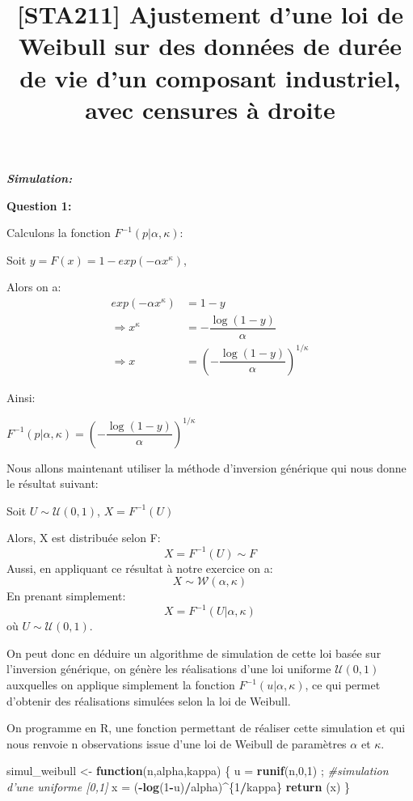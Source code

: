 \documentclass[
]{article}
\title{{[}STA211{]} Ajustement d'une loi de Weibull sur des données de durée de
vie d'un composant industriel, avec censures à droite}
\author{}
\date{\vspace{-2.5em}}
\newenvironment{Shaded}{\begin{snugshade}}{\end{snugshade}}
\newcommand{\CommentTok}[1]{\textcolor[rgb]{0.56,0.35,0.01}{\textit{#1}}}
\newcommand{\ControlFlowTok}[1]{\textcolor[rgb]{0.13,0.29,0.53}{\textbf{#1}}}
\newcommand{\DecValTok}[1]{\textcolor[rgb]{0.00,0.00,0.81}{#1}}
\newcommand{\KeywordTok}[1]{\textcolor[rgb]{0.13,0.29,0.53}{\textbf{#1}}}
\newcommand{\NormalTok}[1]{#1}
\newcommand{\OperatorTok}[1]{\textcolor[rgb]{0.81,0.36,0.00}{\textbf{#1}}}
\newcommand{\StringTok}[1]{\textcolor[rgb]{0.31,0.60,0.02}{#1}}
\begin{document}
\maketitle

\textbf{\emph{Simulation:}}

\textbf{Question 1:}

Calculons la fonction \(F^{-1}(p|\alpha,\kappa)\):

Soit \(y = F(x) = 1 - exp(-\alpha x^{\kappa})\),

Alors on a: \begin{align}
 exp(-\alpha x^{\kappa})  &= 1 - y \\
\Rightarrow  x^{\kappa} &= -\dfrac{\log(1-y)}{\alpha} \\
 \Rightarrow  x &= \left(-\dfrac{\log(1-y)}{\alpha}\right)^{1/\kappa} 
\end{align}

Ainsi:

\(F^{-1}(p|\alpha,\kappa)=\left(-\dfrac{\log(1-y)}{\alpha}\right)^{1/\kappa}\)

Nous allons maintenant utiliser la méthode d'inversion générique qui
nous donne le résultat suivant:

Soit \(U\sim\mathcal U(0,1)\), \(X=F^{-1}(U)\)

Alors, X est distribuée selon F: \[X=F^{-1}(U)\sim F \] Aussi, en
appliquant ce résultat à notre exercice on a:
\[X\sim\mathcal W(\alpha,\kappa) \] En prenant simplement:
\[X=F^{-1}(U|\alpha,\kappa)\] où \(U\sim\mathcal U(0,1)\).

On peut donc en déduire un algorithme de simulation de cette loi basée
sur l'inversion générique, on génère les réalisations d'une loi uniforme
\(\mathcal U(0,1)\) auxquelles on applique simplement la fonction
\(F^{-1}(u|\alpha,\kappa)\), ce qui permet d'obtenir des réalisations
simulées selon la loi de Weibull.

On programme en R, une fonction permettant de réaliser cette simulation
et qui nous renvoie n observations issue d'une loi de Weibull de
paramètres \(\alpha\) et \(\kappa\).

\begin{Shaded}
\begin{Highlighting}[]
\NormalTok{simul_weibull <-}\StringTok{ }\ControlFlowTok{function}\NormalTok{(n,alpha,kappa)}
\NormalTok{\{}
\NormalTok{u =}\StringTok{ }\KeywordTok{runif}\NormalTok{(n,}\DecValTok{0}\NormalTok{,}\DecValTok{1}\NormalTok{) ; }\CommentTok{#simulation d'une uniforme [0,1]}
\NormalTok{x =}\StringTok{ }\NormalTok{(}\OperatorTok{-}\KeywordTok{log}\NormalTok{(}\DecValTok{1}\OperatorTok{-}\NormalTok{u)}\OperatorTok{/}\NormalTok{alpha)}\OperatorTok{^}\NormalTok{\{}\DecValTok{1}\OperatorTok{/}\NormalTok{kappa\}}
\KeywordTok{return}\NormalTok{ (x)}
\NormalTok{\}}
\end{Highlighting}
\end{Shaded}
\end{document}
